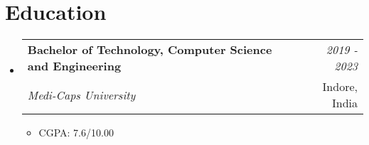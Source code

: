 \documentclass[a4paper,11pt]{article}
\makeatletter
\newcommand{\resumeSubheading}[4]{
\vspace{0.5mm}\item
    \begin{tabular*}{0.98\textwidth}[t]{l@{\extracolsep{\fill}}r}
        \textbf{#1} & \textit{\footnotesize{#4}} \\
        \textit{\footnotesize{#3}} &  \footnotesize{#2}\\
    \end{tabular*}
    \vspace{-2.4mm}
}
\newcommand{\resumeSubHeadingListStart}{\begin{itemize}[leftmargin=*,labelsep=1mm]}
\newcommand{\resumeItemListStart}{\begin{itemize}[leftmargin=*,labelsep=1mm,itemsep=0.5mm]}
\newcommand{\resumeSubHeadingListEnd}{\end{itemize}\vspace{2mm}}
\newcommand{\resumeItemListEnd}{\end{itemize}\vspace{-2mm}}
\makeatother
\begin{document}
\vspace{-4mm}


\section{\textbf{Education}}
\vspace{-0.4mm}
\resumeSubHeadingListStart

\resumeSubheading
{Bachelor of Technology, Computer Science and Engineering}{Indore, India}
{Medi-Caps University }{2019 - 2023}
\resumeItemListStart
\item CGPA: 7.6/10.00
\resumeItemListEnd
\resumeSubHeadingListEnd
\vspace{-6mm}
\end{document}
